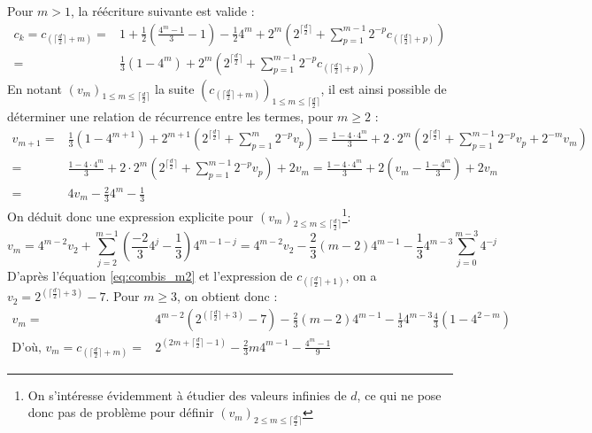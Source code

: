 \documentclass[12pt, twoside]{report}
\begin{document}
Pour $m > 1$, la réécriture suivante est valide :
\begin{equation} \label{eq:combis_m2}
    \begin{split}
        c_k = c_{(\lceil \frac{d}{2} \rceil + m)} = & 1 + \frac{1}{2}\left(\frac{4^m - 1}{3}-1\right) -\frac{1}{2}4^m + 2^m\left(2^{\lceil \frac{d}{2} \rceil} + \sum_{p=1}^{m-1} 2^{-p}c_{(\lceil \frac{d}{2} \rceil + p)}\right)\\
        = & \frac{1}{3}(1-4^m) + 2^m\left(2^{\lceil \frac{d}{2} \rceil} + \sum_{p=1}^{m-1} 2^{-p}c_{(\lceil \frac{d}{2} \rceil + p)}\right)
    \end{split}
\end{equation}
En notant $(v_m)_{1 \leq m \leq \lceil \frac{d}{2} \rceil}$ la suite $(c_{(\lceil \frac{d}{2} \rceil+m)})_{1 \leq m \leq \lceil \frac{d}{2} \rceil}$, il est ainsi possible de déterminer une relation de récurrence entre les termes, pour $m \geq 2$ :
\begin{equation} %
    \begin{split}
        v_{m+1} = & \frac{1}{3}(1-4^{m+1}) + 2^{m+1}\left(2^{\lceil \frac{d}{2} \rceil} + \sum_{p=1}^{m} 2^{-p}v_p\right) = \frac{1 - 4\cdot4^m}{3} + 2\cdot{}2^{m}\left(2^{\lceil \frac{d}{2} \rceil} + \sum_{p=1}^{m-1} 2^{-p}v_p + 2^{-m}v_m\right) \\
        = & \frac{1 - 4\cdot4^m}{3} + 2\cdot{}2^{m}\left(2^{\lceil \frac{d}{2} \rceil} + \sum_{p=1}^{m-1} 2^{-p}v_p\right) + 2v_m = \frac{1 - 4\cdot4^m}{3} + 2\left(v_m - \frac{1-4^m}{3}\right) + 2v_m \\
        = & 4v_m - \frac{2}{3}4^m - \frac{1}{3}
    \end{split}
\end{equation}
On déduit donc une expression explicite pour $(v_m)_{2\leq m \leq \lceil \frac{d}{2} \rceil}$\footnote{On s'intéresse évidemment à étudier des valeurs infinies de $d$, ce qui ne pose donc pas de problème pour définir $(v_m)_{2\leq m \leq \lceil \frac{d}{2} \rceil}$}:
\begin{equation}
    v_m = 4^{m-2} v_2 + \sum_{j=2}^{m-1}\left(\frac{-2}{3}4^j - \frac{1}{3}\right)4^{m-1-j}
    = 4^{m-2} v_2 - \frac{2}{3}(m-2)4^{m-1} - \frac{1}{3}4^{m-3}\sum_{j=0}^{m-3}4^{-j}
\end{equation}
D'après l'équation \ref{eq:combis_m2} et l'expression de $c_{(\lceil \frac{d}{2} \rceil +1)}$, on a $v_2 = 2^{\left(\lceil \frac{d}{2}\rceil + 3\right)}-7$. Pour $m\geq 3$, on obtient donc :
\begin{equation}
    \begin{split}
        v_m = & 4^{m-2}\left(2^{\left(\lceil \frac{d}{2}\rceil + 3\right)}-7\right) - \frac{2}{3}(m-2)4^{m-1} - \frac{1}{3}4^{m-3}\frac{4}{3}(1-4^{2-m})\\
        \textrm{D'où, } v_m = c_{\left(\lceil\frac{d}{2}\rceil + m\right)} = & 2^{\left(2m + \lceil \frac{d}{2}\rceil - 1\right)} - \frac{2}{3}m4^{m-1} - \frac{4^m -1}{9}
    \end{split}
\end{equation}
\end{document}
